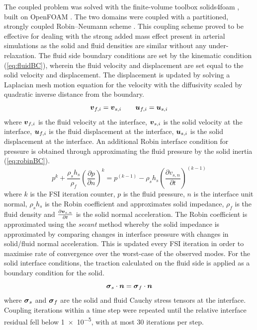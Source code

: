The coupled problem was solved with the finite-volume toolbox solids4foam \citep{cardiff2018opensource,tukovic2018openfoam}, built on OpenFOAM .
The two domains were coupled with a partitioned, strongly coupled Robin--Neumann scheme \citep{tukovic2019added}.
This coupling scheme proved to be effective for dealing with the strong added mass effect present in arterial simulations as the solid and fluid densities are similar without any under-relaxation.
The fluid side boundary conditions are set by the kinematic condition (\cref{eq:fluidBC}), wherein the fluid velocity and displacement are set equal to the solid velocity and displacement.
The displacement is updated by solving a Laplacian mesh motion equation for the velocity with the diffusivity scaled by quadratic inverse distance from the boundary.
\begin{equation}
  \boldsymbol{v}_{f,i} = \boldsymbol{v}_{s,i}
  \qquad
  \boldsymbol{u}_{f,i} = \boldsymbol{u}_{s,i}
  \label{eq:fluidBC}
\end{equation}
where $\boldsymbol{v}_{f,i}$ is the fluid velocity at the interface, $\boldsymbol{v}_{s,i}$ is the solid velocity at the interface, $\boldsymbol{u}_{f,i}$ is the fluid displacement at the interface, $\boldsymbol{u}_{s,i}$ is the solid displacement at the interface.
An additional Robin interface condition for pressure is obtained through approximating the fluid pressure by the solid inertia (\cref{eq:robinBC}).
\begin{equation}
  p^{k} + \frac{\rho_s h_s}{\rho_f} \left(\frac{\partial p}{\partial n}\right)^{k} = p^{\left(k-1\right)} - \rho_s h_s \left(\frac{\partial {v}_{s,n}}{\partial t}\right)^{\left(k-1\right)}
  \label{eq:robinBC}
\end{equation}
where $k$ is the FSI iteration counter, $p$ is the fluid pressure, $n$ is the interface unit normal, $\rho_s h_s$ is the Robin coefficient and approximates solid impedance, $\rho_f$ is the fluid density and $\frac{\partial \boldsymbol{v}_{s,n}}{\partial t}$ is the solid normal acceleration.
The Robin coefficient is approximated using the \textit{secant} method whereby the solid impedance is approximated by comparing changes in interface pressure with changes in solid/fluid normal acceleration.
This is updated every FSI iteration in order to maximise rate of convergence over the worst-case of the observed modes. 
For the solid interface conditions, the traction calculated on the fluid side is applied as a boundary condition for the solid.
\begin{equation}
   \boldsymbol{\sigma}_{s} \cdot \boldsymbol{n} = \boldsymbol{\sigma}_{f} \cdot \boldsymbol{n}
  \label{eq:solidBC}
\end{equation}
where $\boldsymbol{\sigma}_{s}$ and $\boldsymbol{\sigma}_{f}$ are the solid and fluid Cauchy stress tensors at the interface.
Coupling iterations within a time step were repeated until the relative interface residual fell below \num{1e-5}, with at most 30 iterations per step.

